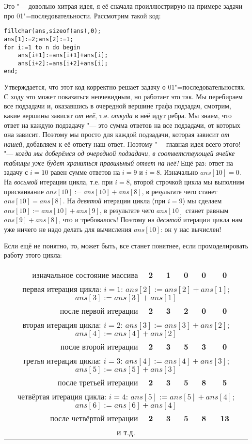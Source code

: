   Это "--- довольно хитрая идея, я её сначала проиллюстрирую на примере задачи про 01"=последовательности. Рассмотрим такой код:
\begin{codesampleo}\begin{verbatim}
fillchar(ans,sizeof(ans),0);
ans[1]:=2;ans[2]:=1;
for i:=1 to n do begin
    ans[i+1]:=ans[i+1]+ans[i];
    ans[i+2]:=ans[i+2]+ans[i];
end;
\end{verbatim}
\end{codesampleo}
Утверждается, что этот код корректно решает задачу о 01"=последовательностях. С ходу это может показаться неочевидным, но работает это так. Мы перебираем все подзадачи и, оказавшись в очередной вершине графа подзадач, смотрим, какие вершины зависят \textit{от неё}, т.е. \textit{откуда} в неё идут ребра. Мы знаем, что ответ на каждую подзадачу "--- это сумма ответов на все подзадачи, от которых она зависит. Поэтому мы просто для каждой подзадачи, которая зависит \textit{от нашей}, добавляем к её ответу наш ответ. Поэтому "--- главная идея всего этого! "--- \textit{когда мы доберёмся од очередной подзадачи, в соответствующей ячейке таблицы уже будет храниться правильный ответ на неё!} Ещё раз: ответ на задачу с $i=10$ равен сумме ответов на $i=9$ и $i=8$. Изначально $ans[10]=0$. На \textit{восьмой} итерации цикла, т.е. при $i=8$, второй строчкой цикла мы выполним присваивание $ans[10]:=ans[10]+ans[8]$, в результате чего станет $ans[10]=ans[8]$. На \textit{девятой} итерации цикла (при $i=9$) мы сделаем $ans[10]:=ans[10]+ans[9]$, в результате чего $ans[10]$ станет равным $ans[9]+ans[8]$, что и требовалось! Поэтому на \textit{десятой} итерации цикла нам уже ничего не надо делать для вычисления $ans[10]$: он у нас вычислен!

Если ещё не понятно, то, может быть, все станет понятнее, если промоделировать работу этого цикла:
\begin{tabular}{r|>{\quad\bfseries}c>{\quad\bfseries}c>{\quad\bfseries}c>{\quad\bfseries}c>{\quad\bfseries}cc}
изначальное состояние массива&2 &1 &0 &0 &0\\
\multicolumn{7}{c}{первая итерация цикла: $i=1$: $ans[2]:=ans[2]+ans[1]$; $ans[3]:=ans[3]+ans[1]$}\\
после первой итерации&2 &3 &2 &0 &0\\
\multicolumn{7}{c}{вторая итерация цикла: $i=2$: $ans[3]:=ans[3]+ans[2]$; $ans[4]:=ans[4]+ans[2]$}\\
после второй итерации&2 &3 &5 &3 &0\\
\multicolumn{7}{c}{третья итерация цикла: $i=3$: $ans[4]:=ans[4]+ans[3]$; $ans[5]:=ans[5]+ans[3]$}\\
после третьей итерации&2 &3 &5 &8 &5\\
\multicolumn{7}{c}{четвёртая итерация цикла: $i=4$: $ans[5]:=ans[5]+ans[4]$; $ans[6]:=ans[6]+ans[4]$}\\
после четвёртой итерации&2 &3 &5 &8 &13\\
\multicolumn{7}{c}{и т.д.}\\
\end{tabular}

